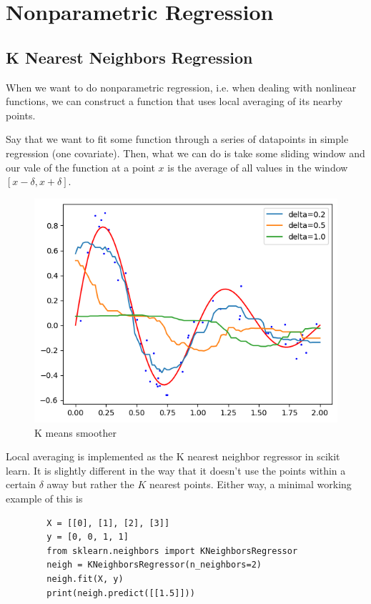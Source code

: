 \section{Nonparametric Regression}

  \subsection{K Nearest Neighbors Regression}

    When we want to do nonparametric regression, i.e. when dealing with nonlinear functions, we can construct a function that uses local averaging of its nearby points. 

    \begin{example}
      Say that we want to fit some function through a series of datapoints in simple regression (one covariate). Then, what we can do is take some sliding window and our vale of the function at a point $x$ is the average of all values in the window $[x - \delta, x + \delta]$. 
      \begin{figure}[H]
        \centering 
        \includegraphics[scale=0.6]{img/kmeans_smoother.png}
        \caption{K means smoother} 
        \label{fig:kmeans_smoother}
      \end{figure}
    \end{example}

    \begin{code}
      Local averaging is implemented as the K nearest neighbor regressor in scikit learn. It is slightly different in the way that it doesn't use the points within a certain $\delta$ away but rather the $K$ nearest points. Either way, a minimal working example of this is 
      \begin{lstlisting}
        X = [[0], [1], [2], [3]]
        y = [0, 0, 1, 1]
        from sklearn.neighbors import KNeighborsRegressor
        neigh = KNeighborsRegressor(n_neighbors=2)
        neigh.fit(X, y)
        print(neigh.predict([[1.5]])) 
      \end{lstlisting}
    \end{code}

